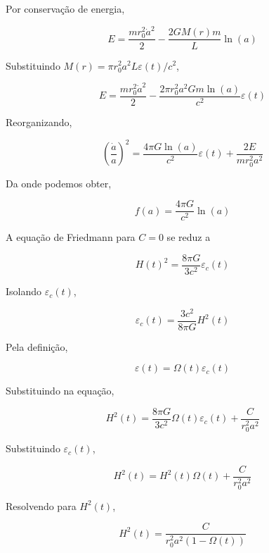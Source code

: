 \documentclass[11pt]{article}
\begin{document}
\begin{pproblem}
\begin{pssolution*}{}{ }
\begin{alternativas}
        Por conservação de energia,

        \[E = \frac{m r_0^2 \dot{a}^2}{2} - \frac{2GM(r)m}{L} \ln(a)\]

        Substituindo \(M(r) = \pi r_0^2 a^2 L \varepsilon(t)/c^2\),

        \[E = \frac{m r_0^2 \dot{a}^2}{2} - \frac{2\pi r_0^2 a^2 G m \ln(a)}{c^2} \varepsilon(t)\]

        Reorganizando,

        \[\left(\frac{\dot{a}}{a}\right)^2 = \frac{4\pi G \ln(a)}{c^2} \varepsilon(t) + \frac{2E}{mr_0^2 a^2}\]

        Da onde podemos obter,

        \[\boxed{f(a) = \frac{4\pi G}{c^2} \ln(a)}\]

        \item A equação de Friedmann para \(C = 0\) se reduz a

        \[H(t)^2 = \frac{8\pi G}{3c^2} \varepsilon_c(t)\]

        Isolando \(\varepsilon_c(t)\),

        \[\boxed{\varepsilon_c(t) = \frac{3c^2}{8\pi G} H^2(t)}\]

        Pela definição,

        \[\varepsilon(t) = \Omega (t) \varepsilon_c(t)\]

        Substituindo na equação,

        \[H^2(t) = \frac{8\pi G}{3c^2} \Omega(t) \varepsilon_c(t) + \frac{C}{r_0^2 a^2}\]

        Substituindo \(\varepsilon_c(t)\),

        \[H^2(t) = H^2(t) \Omega(t) + \frac{C}{r_0^2 a^2}\]

        Resolvendo para \(H^2(t)\),

        \[\boxed{H^2(t) = \frac{C}{r_0^2 a^2 (1 - \Omega(t))}}\]
    \end{alternativas}
\end{pssolution*}
\end{pproblem}
\end{document}
